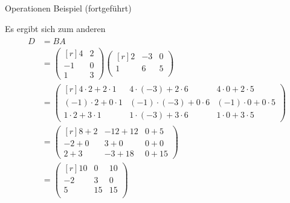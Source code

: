 \documentclass[
  8pt,
  ignorenonframetext,
]{beamer}
\begin{document}
\begin{frame}{Operationen}
\protect\hypertarget{operationen-18}{}
Beispiel (fortgeführt)

\small
\justifying

Es ergibt sich zum anderen \begin{align}
\begin{split}
D
& = BA
\\
& =
\begin{pmatrix*}[r]
4  & 2 \\
-1 & 0 \\
1  & 3
\end{pmatrix*}
\begin{pmatrix*}[r]
2 & -3 & 0 \\
1 &  6 & 5 \\
\end{pmatrix*}
\\
& =
\begin{pmatrix*}[r]
  4    \cdot   2  + 2 \cdot 1
& 4    \cdot (-3) + 2 \cdot 6
& 4    \cdot   0  + 2 \cdot 5
\\
  (-1) \cdot  2  + 0 \cdot 1
& (-1) \cdot(-3) + 0 \cdot 6
& (-1) \cdot  0  + 0 \cdot 5
\\
  1    \cdot  2  + 3 \cdot 1
& 1    \cdot(-3) + 3 \cdot 6
& 1    \cdot  0  + 3 \cdot 5
\end{pmatrix*}
\\
& =
\begin{pmatrix*}[r]
    8 + 2
& -12 + 12
&   0 + 5
\\
   -2 + 0
&   3 + 0
&   0 + 0
\\
    2 + 3
&  -3 + 18
&   0 + 15
\end{pmatrix*}
\\
& =
\begin{pmatrix*}[r]
  10
&  0
& 10
\\
  -2
&  3
&  0
\\
   5
& 15
& 15
\\
\end{pmatrix*}
\end{split}
\end{align}
\end{frame}
\end{document}
